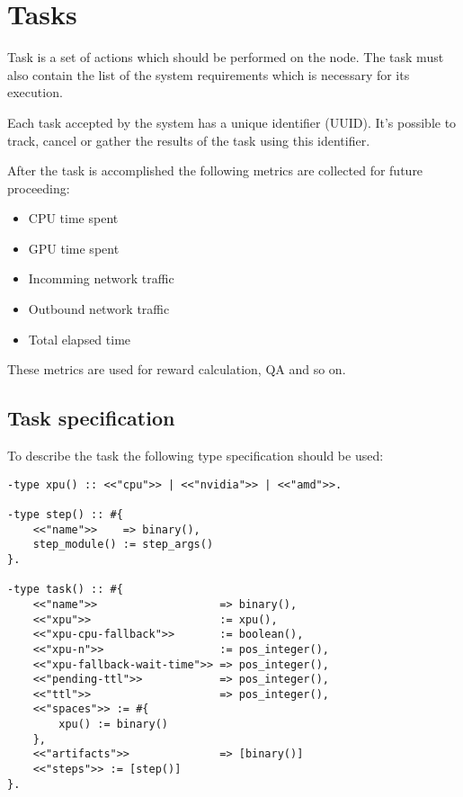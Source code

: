 \section{Tasks}

Task is a set of actions which should be performed on the node.
The task must also contain the list of the system requirements which is necessary for its execution.

Each task accepted by the system has a unique identifier (UUID)\cite{uuid}.
It's possible to track, cancel or gather the results of the task using this identifier.

\newpage

After the task is accomplished the following metrics are collected for future proceeding:

\begin{itemize}
    \item CPU time spent
    \item GPU time spent
    \item Incomming network traffic
    \item Outbound network traffic
    \item Total elapsed time
\end{itemize}

These metrics are used for reward calculation, QA and so on.

\subsection{Task specification}

To describe the task the following type specification should be used:

\begin{verbatim}
-type xpu() :: <<"cpu">> | <<"nvidia">> | <<"amd">>.

-type step() :: #{
    <<"name">>    => binary(),
    step_module() := step_args()
}.

-type task() :: #{
    <<"name">>                   => binary(),
    <<"xpu">>                    := xpu(),
    <<"xpu-cpu-fallback">>       := boolean(),
    <<"xpu-n">>                  := pos_integer(),
    <<"xpu-fallback-wait-time">> => pos_integer(),
    <<"pending-ttl">>            => pos_integer(),
    <<"ttl">>                    => pos_integer(),
    <<"spaces">> := #{
        xpu() := binary()
    },
    <<"artifacts">>              => [binary()]
    <<"steps">> := [step()]
}.
\end{verbatim}

